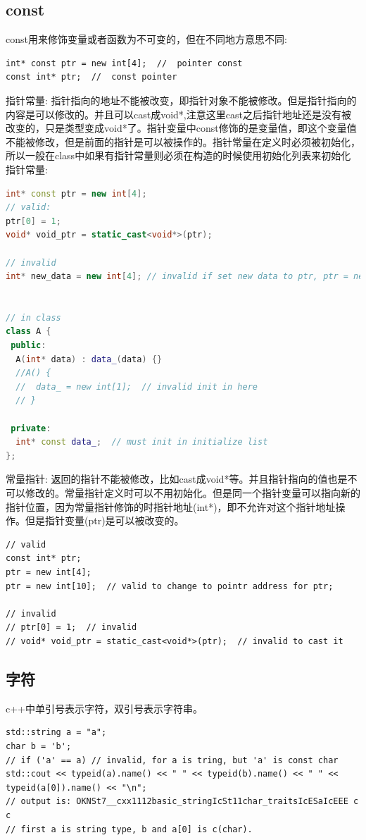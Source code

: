 \documentclass[12pt]{book}
\begin{document}
\subsection{const}
const用来修饰变量或者函数为不可变的，但在不同地方意思不同:
\begin{lstlisting}
int* const ptr = new int[4];  //  pointer const
const int* ptr;  //  const pointer
\end{lstlisting}
指针常量: 指针指向的地址不能被改变，即指针对象不能被修改。但是指针指向的内容是可以修改的。并且可以cast成void*,注意这里cast之后指针地址还是没有被改变的，只是类型变成void*了。指针变量中const修饰的是变量值，即这个变量值不能被修改，但是前面的指针是可以被操作的。指针常量在定义时必须被初始化，所以一般在class中如果有指针常量则必须在构造的时候使用初始化列表来初始化指针常量:
\begin{lstlisting}[language=C++]
int* const ptr = new int[4];
// valid:
ptr[0] = 1;
void* void_ptr = static_cast<void*>(ptr);

// invalid
int* new_data = new int[4]; // invalid if set new data to ptr, ptr = new_data;


// in class
class A {
 public:
  A(int* data) : data_(data) {}
  //A() {
  //  data_ = new int[1];  // invalid init in here
  // }
	
 private:
  int* const data_;  // must init in initialize list 
};
\end{lstlisting}
常量指针: 返回的指针不能被修改，比如cast成void*等。并且指针指向的值也是不可以修改的。常量指针定义时可以不用初始化。但是同一个指针变量可以指向新的指针位置，因为常量指针修饰的时指针地址(int*)，即不允许对这个指针地址操作。但是指针变量(ptr)是可以被改变的。
\begin{lstlisting}
// valid
const int* ptr;
ptr = new int[4];
ptr = new int[10];  // valid to change to pointr address for ptr;

// invalid
// ptr[0] = 1;  // invalid
// void* void_ptr = static_cast<void*>(ptr);  // invalid to cast it
\end{lstlisting}

\subsection{字符}
c++中单引号表示字符，双引号表示字符串。

\begin{lstlisting}
std::string a = "a";
char b = 'b';
// if ('a' == a) // invalid, for a is tring, but 'a' is const char
std::cout << typeid(a).name() << " " << typeid(b).name() << " " << typeid(a[0]).name() << "\n";
// output is: OKNSt7__cxx1112basic_stringIcSt11char_traitsIcESaIcEEE c c
// first a is string type, b and a[0] is c(char).
\end{lstlisting}
\end{document}
